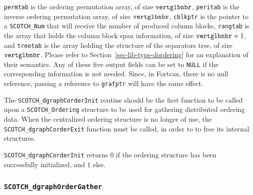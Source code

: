 \begin{itemize}
{\tt permtab} is the ordering permutation array, of size ${\tt
vert\lbt glb\lbt nbr}$, {\tt peritab} is the inverse ordering permutation array,
of size ${\tt vert\lbt glb\lbt nbr}$, {\tt cblkptr} is the pointer to a
{\tt SCOTCH\_\lbt Num} that will receive the number of produced
column blocks, {\tt rangtab} is the array that holds the column block
span information, of size $\mbox{\tt vert\lbt glb\lbt nbr} + 1$, and {\tt treetab}
is the array holding the structure of the separators tree, of size
${\tt vert\lbt glb\lbt nbr}$. Please refer to
Section~\ref{sec-lib-type-dordering} for an explanation of their semantics.
Any of these five output fields can be set to {\tt NULL} if the
corresponding information is not needed. Since, in Fortran, there is
no null reference, passing a reference to {\tt grafptr} will have the
same effect.

The {\tt SCOTCH\_\lbt dgraph\lbt Corder\lbt Init} routine should be
the first function to be called upon a {\tt SCOTCH\_\lbt Ordering}
structure to be used for gathering distributed ordering data. When the
centralized ordering structure is no longer of use, the {\tt
SCOTCH\_\lbt dgraph\lbt Corder\lbt Exit} function must be called, in
order to to free its internal structures.

\progret

{\tt SCOTCH\_dgraphCorderInit} returns $0$ if the ordering structure has
been successfully initialized, and $1$ else.
\end{itemize}

\subsubsection{{\tt SCOTCH\_dgraphOrderGather}}
\label{sec-lib-func-dgraphordergather}

